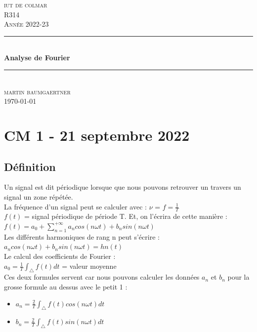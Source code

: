 \documentclass[12pt, a4paper]{article}
\begin{document}
\begin{titlepage}
	\newcommand{\HRule}{\rule{\linewidth}{0.5mm}} 
	\center 
	\textsc{\LARGE iut de colmar}\\[6.5cm] 
	\textsc{\Large R314}\\[0.5cm] 
	\textsc{\large Année 2022-23}\\[0.5cm]
	\HRule\\[0.75cm]
	{\huge\bfseries Analyse de Fourier}\\[0.4cm]
	\HRule\\[1.5cm]
	\textsc{\large martin baumgaertner}\\[6.5cm] 

	\vfill\vfill\vfill
	{\large\today} 
	\vfill
\end{titlepage}
\newpage
\tableofcontents
\newpage
\section{CM 1 - 21 septembre 2022}
\subsection{Définition}
Un signal est dit périodique lorsque que nous pouvons retrouver un travers
un signal un zone répétée.\\
La fréquence d'un signal peut se calculer avec : $ \nu $ = $ f = \frac{1}{T} $\\[1cm]
$ f(t) $ = signal périodique de période T. Et, on l'écrira de cette manière :\\[0.5cm]
$ f(t) = a_{0} + \sum_{n=1}^{+\infty} a_{n}cos(n \omega t) + b_{n}sin(n \omega t) $\\

Les différents harmoniques de rang n peut s'écrire :\\
$ a_{n} cos(n \omega t) + b_{n}sin(n \omega t) = hn(t)$\\

Le calcul des coefficients de Fourier  :\\
$ a_{0} = \frac{1}{T} \int_{\bigtriangleup } f(t) dt $ = valeur moyenne \\[0.5cm]

Ces deux formules servent car nous pouvons calculer les données $ a_{n} $ et $ b_{n} $ 
pour la grosse formule au dessus avec le petit 1 : 
\begin{itemize}
    \item $ a_{n} = \frac{2}{T} \int_{\bigtriangleup } f(t) cos(n \omega t) dt $
    \item $ b_{n} = \frac{2}{T} \int_{\bigtriangleup } f(t) sin(n \omega t) dt $
\end{itemize}
\end{document}
